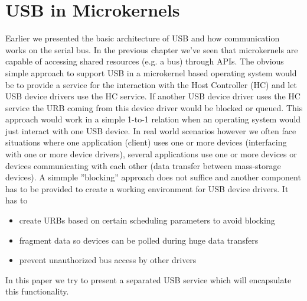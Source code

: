 \documentclass{acm_proc_article-sp}
\begin{document}
\section{USB in Microkernels}
Earlier we presented the basic architecture of USB and how communication works on the serial bus.
In the previous chapter we've seen that microkernels are capable of accessing shared resources
(e.g. a bus) through APIs.
The obvious simple approach to support USB in a microkernel based operating system would be to provide
a service for the interaction with the Host Controller (HC) and let USB device drivers use the HC service.
If another USB device driver uses the HC service the URB coming from this device driver would be
blocked or queued.
This approach would work in a simple 1-to-1 relation when an operating system would just interact
with one USB device.
In real world scenarios however we often face situations where one application (client) uses one or more
devices (interfacing with one or more device drivers), several applications use one or more devices or
devices communicating with each other (data transfer between mass-storage devices).
A simmple ''blocking'' approach does not suffice and another component has to be provided to create a working
environment for USB device drivers.
It has to
\begin{itemize}
\item create URBs based on certain scheduling parameters to avoid blocking
\item fragment data so devices can be polled during huge data transfers
\item prevent unauthorized bus access by other drivers
\end{itemize}
In this paper we try to present a separated USB service which will encapsulate this functionality.
\end{document}
